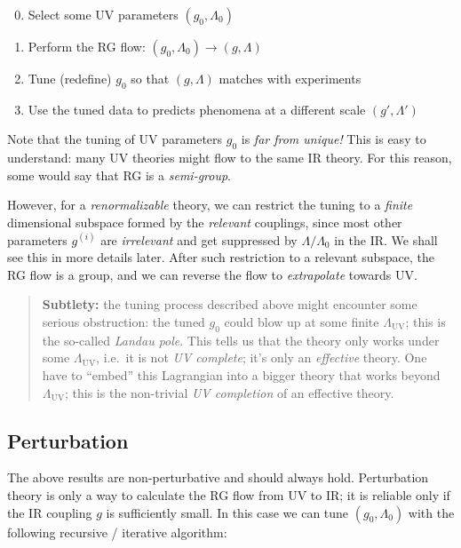 \documentclass[a4paper
	,10pt
]{article}
\begin{document}
	\begin{enumerate}[noitemsep,midpenalty=100]
	\setcounter{enumi}{-1}
	
	\item
	  Select some UV parameters $(g_0,\Lambda_0)$
	\item
	  Perform the RG flow: $(g_0,\Lambda_0)\to (g,\Lambda)$
	\item
	  Tune (redefine) $g_0$ so that $(g,\Lambda)$ matches with
	  experiments
	\item
	  Use the tuned data to predicts phenomena at a different scale
	  $(g',\Lambda')$
	\end{enumerate}
	
	Note that the tuning of UV parameters $g_0$ is \emph{far from unique!}
	This is easy to understand: many UV theories might flow to the same IR
	theory. For this reason, some would say that RG is a \emph{semi-group}.
	
	However, for a \emph{renormalizable} theory, we can restrict the tuning
	to a \emph{finite} dimensional subspace formed by the \emph{relevant}
	couplings, since most other parameters $g^{(i)}$ are \emph{irrelevant}
	and get suppressed by $\Lambda/\Lambda_0$ in the IR. We shall see this in more details later. After such
	restriction to a relevant subspace, the RG flow is a group, and we can
	reverse the flow to \emph{extrapolate} towards UV.
	
	\begin{quote}
	\textbf{Subtlety:} the tuning process described above might encounter some serious
	obstruction: the tuned $g_0$ could blow up at some finite
	$\Lambda_{\mathrm{UV}}$; this is the so-called \emph{Landau pole}.
	This tells us that the theory only works under some
	$\Lambda_{\mathrm{UV}}$, i.e.~it is not \emph{UV complete}; it's only
	an \emph{effective} theory. One have to ``embed'' this Lagrangian into a
	bigger theory that works beyond $\Lambda_{\mathrm{UV}}$; this is the
	non-trivial \emph{UV completion} of an effective theory.
	\end{quote}
	
\subsection{Perturbation}
	The above results are non-perturbative and should always hold.
	Perturbation theory is only a way to calculate the RG flow from UV to
	IR; it is reliable only if the IR coupling $g$ is sufficiently small.
	In this case we can tune $(g_0,\Lambda_0)$ with the following
	recursive / iterative algorithm:
	
\end{document}
